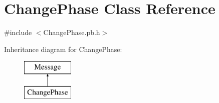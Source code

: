 \hypertarget{class_change_phase}{\section{Change\-Phase Class Reference}
\label{class_change_phase}
}


{\ttfamily \#include $<$Change\-Phase.\-pb.\-h$>$}

Inheritance diagram for Change\-Phase\-:\begin{figure}[H]
\begin{center}
\leavevmode
\includegraphics[height=2.000000cm]{class_change_phase}
\end{center}
\end{figure}
